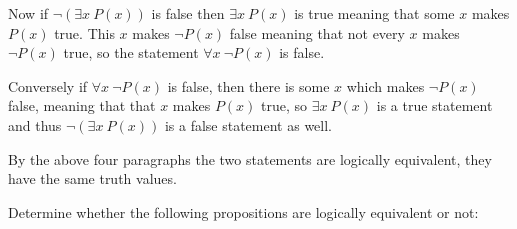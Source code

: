 \documentclass[addpoints, answers]{exam}
\begin{document}
\begin{questions}
\begin{parts}
\begin{solution}
      Now if $\neg(\exists x \ P(x))$ is false then $\exists x \ P(x)$ is true
      meaning that some $x$ makes $P(x)$ true. This $x$ makes $\neg P(x)$ false
      meaning that not every $x$ makes $\neg P(x)$ true, so the statement
      $\forall x \ \neg P(x)$ is false.
      
      Conversely if $\forall x \ \neg P(x)$ is false, then there is some $x$
      which makes $\neg P(x)$ false, meaning that that $x$ makes $P(x)$ true, so
      $\exists x \ P(x)$ is a true statement and thus $\neg (\exists x \ P(x))$
      is a false statement as well.

      By the above four paragraphs the two statements are logically equivalent,
      they have the same truth values.
    \end{solution}

  \end{parts}

  \question[10] Determine whether the following propositions are logically
  equivalent or not:
\end{questions}
\end{document}
